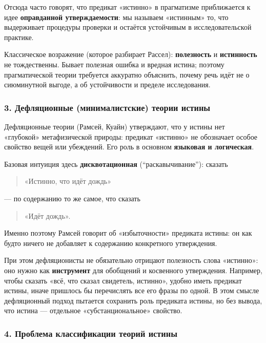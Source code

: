 \documentclass[a4paper,12pt]{article}
\begin{document}
Отсюда часто говорят, что предикат «истинно» в прагматизме приближается к идее \textbf{оправданной утверждаемости}: мы называем «истинным» то, что выдерживает процедуры проверки и остаётся устойчивым в исследовательской практике.

Классическое возражение (которое разбирает Рассел): \textbf{полезность} и \textbf{истинность} не тождественны. Бывает полезная ошибка и вредная истина; поэтому прагматической теории требуется аккуратно объяснить, почему речь идёт не о сиюминутной выгоде, а об устойчивости и пределе исследования.

\subsubsection*{3. Дефляционные (минималистские) теории истины}

Дефляционные теории (Рамсей, Куайн) утверждают, что у истины нет «глубокой» метафизической природы: предикат «истинно» не обозначает особое свойство вещей или убеждений. Его роль в основном \textbf{языковая и логическая}.

Базовая интуиция здесь \textbf{дисквотационная} (``раскавычивание''): сказать
\begin{quote}
«Истинно, что идёт дождь»
\end{quote}
--- по содержанию то же самое, что сказать
\begin{quote}
«Идёт дождь».
\end{quote}
Именно поэтому Рамсей говорит об «избыточности» предиката истины: он как будто ничего не добавляет к содержанию конкретного утверждения.

При этом дефляционисты не обязательно отрицают полезность слова «истинно»: оно нужно как \textbf{инструмент} для обобщений и косвенного утверждения. Например, чтобы сказать «всё, что сказал свидетель, истинно», удобно иметь предикат истины, иначе пришлось бы перечислять все его фразы по одной. В этом смысле дефляционный подход пытается сохранить роль предиката истины, но без вывода, что истина --- отдельное «субстанциональное» свойство.

\subsubsection*{4. Проблема классификации теорий истины}
\end{document}
